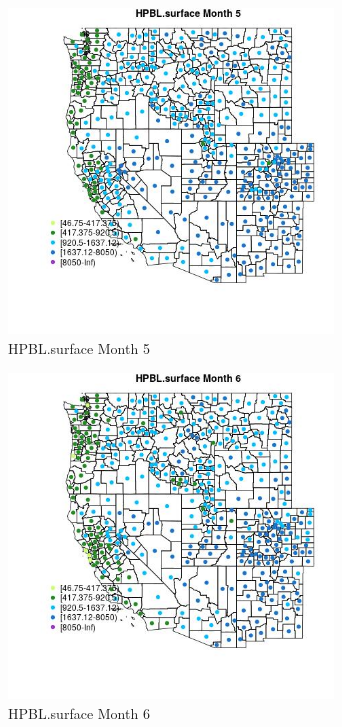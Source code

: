 \begin{figure} 
\centering  
\includegraphics[width=0.77\textwidth]{Code_Outputs/df_report_ML_predictors_CountyCentroid_Locations_Dates_2008-01-01to2018-12-31_MapObsMo5HPBLsurface.jpg} 
\caption{\label{fig:df_report_ML_predictors_CountyCentroid_Locations_Dates_2008-01-01to2018-12-31MapObsMo5HPBLsurface}HPBL.surface Month 5} 
\end{figure} 
 

\begin{figure} 
\centering  
\includegraphics[width=0.77\textwidth]{Code_Outputs/df_report_ML_predictors_CountyCentroid_Locations_Dates_2008-01-01to2018-12-31_MapObsMo6HPBLsurface.jpg} 
\caption{\label{fig:df_report_ML_predictors_CountyCentroid_Locations_Dates_2008-01-01to2018-12-31MapObsMo6HPBLsurface}HPBL.surface Month 6} 
\end{figure} 
 

